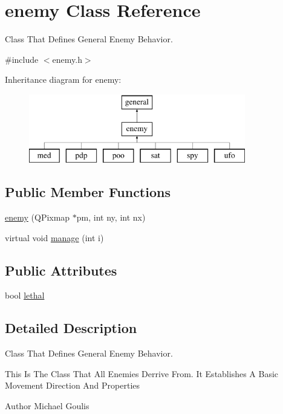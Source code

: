 \hypertarget{classenemy}{\section{enemy \-Class \-Reference}
\label{classenemy}
}


\-Class \-That \-Defines \-General \-Enemy \-Behavior.  




{\ttfamily \#include $<$enemy.\-h$>$}

\-Inheritance diagram for enemy\-:\begin{figure}[H]
\begin{center}
\leavevmode
\includegraphics[height=3.000000cm]{classenemy}
\end{center}
\end{figure}
\subsection*{\-Public \-Member \-Functions}
\begin{DoxyCompactItemize}
\item 
\hyperlink{classenemy_ac2807eb1d070f7aa0821f58aa91c6601}{enemy} (\-Q\-Pixmap $\ast$pm, int ny, int nx)
\item 
virtual void \hyperlink{classenemy_a0d29f4c2619917d29f8d7def0ef08430}{manage} (int i)
\end{DoxyCompactItemize}
\subsection*{\-Public \-Attributes}
\begin{DoxyCompactItemize}
\item 
bool \hyperlink{classenemy_a89eadc9a59757ee451a82d6570c2d9da}{lethal}
\end{DoxyCompactItemize}


\subsection{\-Detailed \-Description}
\-Class \-That \-Defines \-General \-Enemy \-Behavior. 

\-This \-Is \-The \-Class \-That \-All \-Enemies \-Derrive \-From. \-It \-Establishes \-A \-Basic \-Movement \-Direction \-And \-Properties \begin{DoxyAuthor}{\-Author}
\-Michael \-Goulis 
\end{DoxyAuthor}


